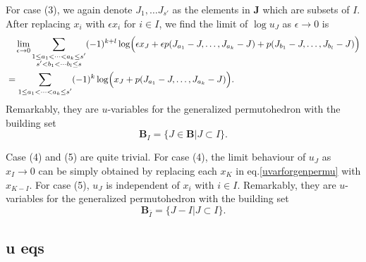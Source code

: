 \documentclass[hidelinks,12pt]{article}
\begin{document}
For case (3), we again denote $J_{1},\ldots J_{s'}$ as the elements in $\mathbf{J}$ which are subsets of $ I$. After replacing $x_{i}$ with $\epsilon x_{i}$ for $i\in I$, we find the limit of $\log u_{J}$ as $\epsilon \to 0$ is
\begin{align}
  &\quad \lim_{\epsilon\to 0}  \sum_{\substack {1 \leq a_{1}<\cdots<a_{k}\leq s'\\ s'<b_{1}<\cdots b_{l}\leq s}}(-1)^{k+l}\log\Bigl( \epsilon x_{J}+\epsilon p(J_{a_{1}}-J,\ldots,J_{a_{k}}-J) + p(J_{b_{1}}-J,\ldots, J_{b_{l}}-J)\Bigr) \nonumber \\
  &=\sum_{\substack {1 \leq a_{1}<\cdots<a_{k}\leq s'}}(-1)^{k}\log\Bigl( x_{J}+ p(J_{a_{1}}-J,\ldots,J_{a_{k}}-J) \Bigr). 
\end{align}
Remarkably, they are $u$-variables for the generalized permutohedron with the building set
\begin{equation}
   \mathbf{B}_{I} = \{J\in\mathbf{B} \vert J\subset I\}.
\end{equation}

Case (4) and (5) are quite trivial. For case (4), the limit behaviour of $u_{J}$ as $x_{I}\to 0$ can be simply obtained by replacing each $x_{K}$ in eq.\eqref{uvarforgenpermu} with $x_{K-I}$. For case (5), $u_{J}$ is  independent of $x_{i}$ with $i\in I$. Remarkably, they are $u$-variables for the generalized permutohedron with the building set
\begin{equation}
   \mathbf{B}_{\bar{I}} = \{J-I \vert J\subset I\}.
\end{equation}





\subsection{u eqs}
\end{document}
